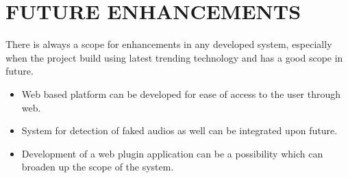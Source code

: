 
\section{FUTURE ENHANCEMENTS}
There is always a scope for enhancements in any developed system, especially
when the project build using latest trending technology and has a good scope in
future.
\begin{itemize}
    \item Web based platform can be developed for ease of access to
          the user through web.
    \item System for detection of faked audios as well can be integrated upon future.
    \item Development of a web plugin application can be a possibility which can broaden up the scope of the system. 
\end{itemize}
